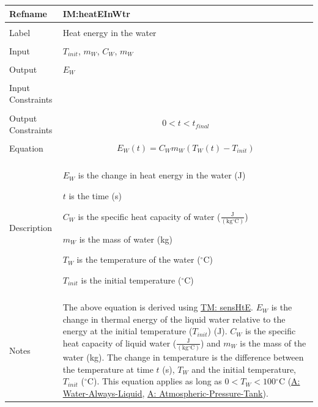 \documentclass[12pt]{article}
\begin{document}
\noindent \begin{minipage}{\textwidth}
\begin{tabular}{p{} p{}}
\toprule \textbf{Refname} & \textbf{IM:heatEInWtr}
\label{IM:heatEInWtr}
\\ \midrule \\
Label & Heat energy in the water
\\ \midrule \\
Input & ${T_{init}}$, ${m_{W}}$, ${C_{W}}$, ${m_{W}}$
\\ \midrule \\
Output & ${E_{W}}$
\\ \midrule \\
Input Constraints & 
\\ \midrule \\
Output Constraints & \begin{displaymath}
                     0<t<{t_{final}}
                     \end{displaymath}
\\ \midrule \\
Equation & \begin{displaymath}
           {E_{W}}\left(t\right)={C_{W}} {m_{W}} \left({T_{W}}\left(t\right)-{T_{init}}\right)
           \end{displaymath}
\\ \midrule \\
Description & \begin{symbDescription}
              \item{${E_{W}}$ is the change in heat energy in the water (J)}
              \item{$t$ is the time (s)}
              \item{${C_{W}}$ is the specific heat capacity of water ($\frac{\text{J}}{(\text{kg}{}^{\circ}\text{C})}$)}
              \item{${m_{W}}$ is the mass of water (kg)}
              \item{${T_{W}}$ is the temperature of the water (${}^{\circ}$C)}
              \item{${T_{init}}$ is the initial temperature (${}^{\circ}$C)}
              \end{symbDescription}
\\ \midrule \\
Notes & The above equation is derived using \hyperref[TM:sensHtE]{TM: sensHtE}. ${E_{W}}$ is the change in thermal energy of the liquid water relative to the energy at the initial temperature (${T_{init}}$) (J). ${C_{W}}$ is the specific heat capacity of liquid water ($\frac{\text{J}}{(\text{kg}{}^{\circ}\text{C})}$) and ${m_{W}}$ is the mass of the water (kg). The change in temperature is the difference between the temperature at time $t$ (s), ${T_{W}}$ and the initial temperature, ${T_{init}}$ (${}^{\circ}$C). This equation applies as long as $0<{T_{W}}<100$${}^{\circ}$C (\hyperref[assumpWAL]{A: Water-Always-Liquid}, \hyperref[assumpAPT]{A: Atmospheric-Pressure-Tank}).
$$
\end{tabular}
\end{minipage}
\end{document}
